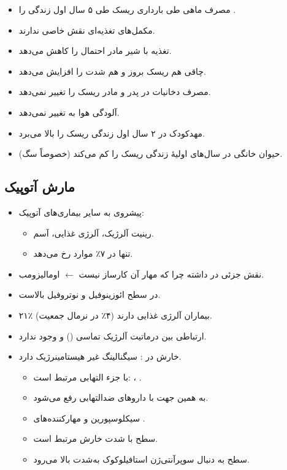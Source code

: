\documentclass[12pt,a4paper]{article}
\begin{document}
\begin{itemize}
  \item مصرف ماهی طی بارداری ریسک  طی ۵ سال اول زندگی را .
  \item مکمل‌های تغذیه‌ای نقش خاصی ندارند.
  \item تغذیه با شیر مادر احتمال  را کاهش می‌دهد.
  \item چاقی هم ریسک بروز و هم شدت  را افزایش می‌دهد.
  \item مصرف دخانیات در پدر و مادر ریسک  را تغییر نمی‌دهد.
  \item آلودگی هوا به  تغییر نمی‌دهد.
  \item مهدکودک در ۲ سال اول زندگی ریسک را بالا می‌برد.
  \item حیوان خانگی در سال‌های اولیهٔ زندگی ریسک را کم می‌کند (خصوصاً سگ).
\end{itemize}

\subsection*{مارش آتوپیک}
\begin{itemize}
  \item پیشروی  به سایر بیماری‌های آتوپیک:
  \begin{itemize}
    \item رینیت آلرژیک، آلرژی غذایی، آسم.
    \item تنها در ۷٪ موارد  رخ می‌دهد.
  \end{itemize}
  \item {} نقش جزئی در  داشته چرا که مهار آن کارساز نیست $\leftarrow$ اومالیزومب.
  \item در  سطح ائوزینوفیل و نوتروفیل بالاست.
  \item ۲۱٪ بیماران  آلرژی غذایی دارند (۴٪ در نرمال جمعیت).
  \item ارتباطی بین درماتیت آلرژیک تماسی () و  وجود ندارد.
\end{itemize}

\begin{itemize}
  \item خارش در : سیگنالینگ غیر هیستامینرژیک دارد.
  \begin{itemize}
    \item با جزء التهابی  مرتبط است: ، .
    \item به همین جهت با داروهای ضدالتهابی رفع می‌شود.
    \item سیکلوسپورین و مهارکننده‌های .
    \item سطح  با شدت خارش مرتبط است.
    \item سطح  به دنبال سوپرآنتی‌ژن استافیلوکوک به‌شدت بالا می‌رود.
  \end{itemize}
\end{itemize}
\end{document}
